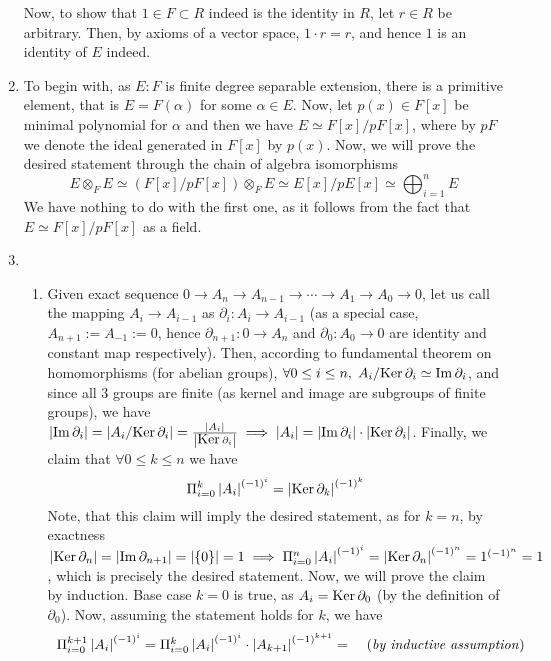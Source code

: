 \documentclass[8pt,fleqn]{article} %
\begin{document}
\begin{enumerate}[label=\bfseries Problem \arabic*.]
		Now, to show that $1\in F\subset R$ indeed is the identity in $R$, let $r\in R$ be arbitrary. Then, by axioms of
		a vector space, $1\cdot r=r$, and hence $1$ is an identity of $E$ indeed.
	\item To begin with, as $E:F$ is finite degree separable extension, there is a primitive element, that is $E=F(\alpha)$
		for some $\alpha\in E$. Now, let $p(x)\in F[x]$ be minimal polynomial for $\alpha$ and then we have $E\simeq F[x]
		/pF[x]$, where by $pF$ we denote the ideal generated in $F[x]$ by $p(x)$. Now, we will prove the desired
		statement through the chain of algebra isomorphisms
		\[E\otimes_F E\simeq (F[x]/pF[x])\otimes_F E\simeq E[x]/pE[x]\simeq \bigoplus_{i=1}^n E\]
		We have nothing to do with the first one, as it follows from the fact that $E\simeq F[x]/pF[x]$ as a field.
	\item \begin{enumerate}[label=(\arabic*).]
				\newcommand{\Ker}{\mbox{\normalfont Ker\,}}
			\item Given exact sequence $0\to A_n\to A_{n-1}\to\cdots\to A_1\to A_0\to 0$, let us call the mapping 
				$A_i\to A_{i-1}$ as $\partial_i: A_i\to A_{i-1}$ (as a special case, $A_{n+1}:=A_{-1}:=0$, hence
				$\partial_{n+1}:0\to A_n$ and $\partial_0:A_0\to 0$ are identity and constant map respectively).
				Then, according to fundamental theorem on homomorphisms (for abelian groups), $\forall 0\leq i\leq n,
				\;A_i/\Ker \partial_i\simeq\Im\partial_i$, and since all 3 groups are finite (as kernel and image
				are subgroups of finite groups), we have
				$\myabs{\Im\partial_i}=\myabs{A_i/\Ker\partial_i}=\frac{\myabs{A_i}}
				{\myabs{\Ker\partial_i}}\implies \myabs{A_i}=\myabs{\Im\partial_i}\cdot\myabs{\Ker\partial_i}$.
				Finally, we claim that $\forall 0\leq k\leq n$ we have 
				\[\Pi_{i=0}^k \myabs{A_i}^{(-1)^i}=\myabs{\Ker\partial_k}^{(-1)^k}\]
				Note, that this claim will imply the desired statement, as for $k=n$, by exactness
				$\myabs{\Ker\partial_n}=\myabs{\Im\partial_{n+1}}=\myabs{\mycbra{0}}=1\implies
				\Pi_{i=0}^n \myabs{A_i}^{(-1)^i}=\myabs{\Ker\partial_n}^{(-1)^n}=1^{(-1)^n}=1$, which is precisely
				the desired statement. Now, we will prove the claim by induction. Base case $k=0$ is true, as
				$A_i=\Ker\partial_0$ (by the definition of $\partial_0$). Now, assuming the statement holds
				for $k$, we have
		\[\begin{array}{rr}
			\Pi_{i=0}^{k+1}\left|A_i\right|^{(-1)^i}=\Pi_{i=0}^{k}\left|A_i\right|^{(-1)^i}\cdot\left|A_{k+1}\right|^{(-1)^{k+1}}=
			&\mbox{ (\textit{by inductive assumption}) }\\

\end{array}\]
\end{enumerate}
\end{enumerate}
\end{document}
